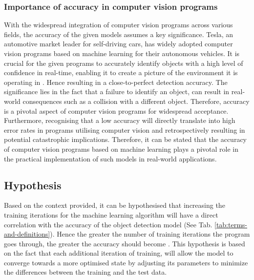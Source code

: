 \subsubsection{Importance of accuracy in computer vision programs}
With the widespread integration of computer vision programs across various fields, the accuracy of the given models assumes a key significance. Tesla, an automotive market leader for self-driving cars, has widely adopted computer vision programs based on machine learning for their autonomous vehicles. It is crucial for the given programs to accurately identify objects with a high level of confidence in real-time, enabling it to create a picture of the environment it is operating in \parencite{Baeldung2022}. Hence resulting in a close-to-perfect detection accuracy. The significance lies in the fact that a failure to identify an object, can result in real-world consequences such as a collision with a different object. Therefore, accuracy is a pivotal aspect of computer vision programs for widespread acceptance. Furthermore, recognising that a low accuracy will directly translate into high error rates in programs utilising computer vision and retrospectively resulting in potential catastrophic implications. Therefore, it can be stated that the accuracy of computer vision programs based on machine learning plays a pivotal role in the practical implementation of such models in real-world applications. \\

\subsection{Hypothesis}
Based on the context provided, it can be hypothesised that increasing the training iterations for the machine learning algorithm will have a direct correlation with the accuracy of the object detection model (See Tab. \ref{tab:terms-and-definitions}). Hence the greater the number of training iterations the program goes through, the greater the accuracy should become \parencite[p.~362--371]{Nagaki2021}. This hypothesis is based on the fact that each additional iteration of training, will allow the model to converge towards a more optimised state by adjusting its parameters to minimize the differences between the training and the test data.\\

